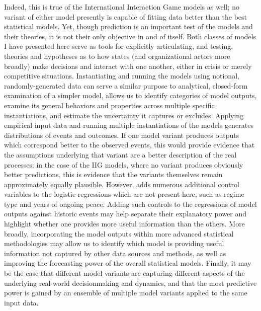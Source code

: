 Indeed, this is true of the International Interaction Game models as well; no variant of either model presently is capable of fitting data better than the best statistical models. Yet, though prediction is an important test of the models and their theories, it is not their only objective in and of itself. Both classes of models I have presented here serve as tools for explicitly articulating, and testing, theories and hypotheses as to how states (and organizational actors more broadly) make decisions and interact with one another, either in crisis or merely competitive situations. Instantiating and running the models using notional, randomly-generated data can serve a similar purpose to analytical, closed-form examination of a simpler model, allows us to identify categories of model outputs, examine its general behaviors and properties across multiple specific instantiations, and estimate the uncertainty it captures or excludes. Applying empirical input data and running multiple instantiations of the models generates distributions of events and outcomes. If one model variant produces outputs which correspond better to the observed events, this would provide evidence that the assumptions underlying that variant are a better description of the real processes; in the case of the IIG models, where no variant produces obviously better predictions, this is evidence that the variants themselves remain approximately equally plausible.  However, \citet{bennett_2000} adds numerous additional control variables to the logistic regressions which are not present here, such as regime type and years of ongoing peace. Adding such controls to the regressions of model outputs against historic events may help separate their explanatory power and highlight whether one provides more useful information than the others. More broadly, incorporating the model outputs within more advanced statistical methodologies may allow us to identify which model is providing useful information not captured by other data sources and methods, as well as improving the forecasting power of the overall statistical models. Finally, it may be the case that different model variants are capturing different aspects of the underlying real-world decisionmaking and dynamics, and that the most predictive power is gained by an ensemble of multiple model variants applied to the same input data.

